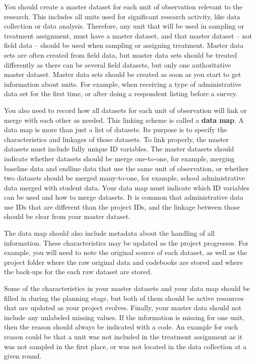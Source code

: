 You should create a master dataset
for each unit of observation
relevant to the research.
This includes all units used for significant research activity,
like data collection or data analysis.
Therefore, any unit
that will be used in sampling or treatment assignment,
must have a master dataset,
and that master dataset -- not field data --
should be used when sampling or assigning treatment.
Master data sets are often created from field data,
but master data sets should be treated differently
as there can be several field datasets,
but only one authoritative master dataset.
Master data sets should be created as soon as you
start to get information about units.
For example, when receiving a type of administrative data set for the first time,
or after doing a respondent listing before a survey.

You also need to record how all datasets for each unit of observation
will link or merge with each other as needed.
This linking scheme is called a \textbf{data map}.
A data map is more than just a list of datasets.
Its purpose is to specify the characteristics and linkages of those datasets.
To link properly, the master datasets must include fully unique ID variables.
The master datasets should indicate whether datasets should be merge one-to-one,
for example, merging baseline data and endline data that use the same unit of observation,
or whether two datasets should be merged many-to-one, 
for example, school administrative data merged with student data.
Your data map must indicate which ID variables can be used and how to merge datasets.
It is common that administrative data use IDs 
that are different than the project IDs, 
and the linkage between those should be clear from your master dataset.

The data map should also include metadata about the handling of all information.
These characteristics may be updated as the project progresses.
For example, you will need to note the original source of each dataset,
as well as the project folder where 
the raw original data and codebooks are stored
and where the back-ups for the each raw dataset are stored.

Some of the characteristics in your master datasets and your data map
should be filled in during the planning stage,
but both of them should be active resources 
that are updated as your project evolves.
Finally, your master data should not include any unlabeled missing values. 
If the information is missing for one unit, 
then the reason should always be indicated with a code.
An example for such reason could be that a unit was not included in the treatment assignment
as it was not sampled in the first place,
or was not located in the data collection at a given round.

